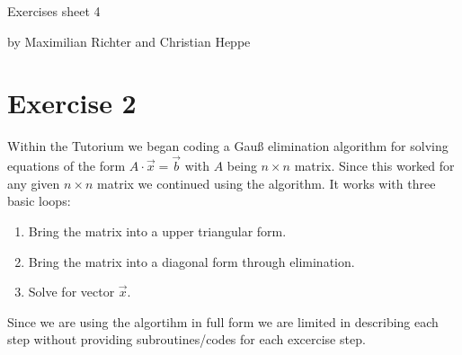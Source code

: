 \documentclass[12pt,a4paper]{article}
\begin{document}
\centerline{\large Exercises sheet 4}\vspace{0.5em}
\centerline{\large by Maximilian Richter and Christian Heppe}\vspace{2em}

\section*{Exercise 2}

Within the Tutorium we began coding a Gauß elimination algorithm for solving equations of the form $A\cdot\vec{x}=\vec{b}$ with $A$ being $n\times n$ matrix. Since this worked for any given $n\times n$ matrix we continued using the algorithm. It works with three basic loops:	
		\begin{enumerate}[label=\roman*.]
			\item Bring the matrix into a upper triangular form.
			\item Bring the matrix into a diagonal form through elimination.
			\item Solve for vector $\vec{x}$.
		\end{enumerate}
Since we are using the algortihm in full form we are limited in describing each step without providing subroutines/codes for each excercise step.
\end{document}
